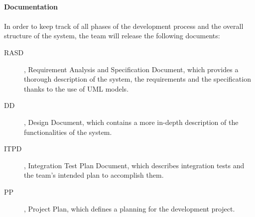 \FloatBarrier %

	\paragraph{Documentation}
	\paragraph{} In order to keep track of all phases of the development process and the overall structure of the system, the team will release the following documents:
		\begin{description}
			\item[RASD], Requirement Analysis and Specification Document, which provides a thorough description of the system, the requirements and the specification thanks to the use of UML models.
			\item[DD], Design Document, which contains a more in-depth description of the functionalities of the system.
			\item[ITPD], Integration Test Plan Document, which describes integration tests and the team's intended plan to accomplish them.
			\item[PP], Project Plan, which defines a planning for the development project.
			
		\end{description}